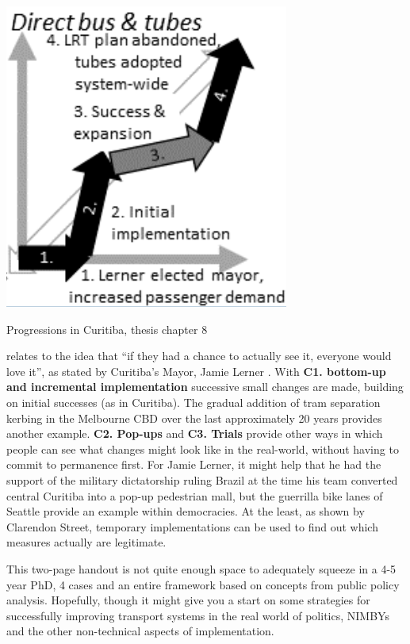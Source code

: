\documentclass[nobib]{tufte-handout}
\begin{document}
\begin{marginfigure}
        \includegraphics[width=\linewidth]{Curitiba_3}
  \caption{Progressions in Curitiba, thesis chapter 8}
  \label{fig:Curitiba}
\end{marginfigure}

 relates to the idea that “if they had a chance to actually see it, everyone would love it”, as stated by Curitiba's Mayor, Jamie Lerner \citep{McKibben:2007aa}. With \textbf{C1. bottom-up and incremental implementation} successive small changes are made, building on initial successes (as in Curitiba). The gradual addition of tram separation kerbing in the Melbourne CBD over the last  approximately 20 years provides another example. \textbf{C2. Pop-ups} and \textbf{C3. Trials} provide other ways in which people can see what changes might look like in the real-world, without having to commit to permanence first.  For Jamie Lerner, it might help that he had the support of the military dictatorship ruling Brazil at the time his team converted central Curitiba into a pop-up pedestrian mall, but the guerrilla bike lanes of Seattle\citep{Fucoloro:2013aa} provide an example within democracies. At the least, as shown by Clarendon Street\citep{Silkstone:2005aa}, temporary implementations can be used to find out which measures actually are legitimate.

This two-page handout is not quite enough space to adequately squeeze in a 4-5 year PhD, 4 cases and an entire framework based on concepts from public policy analysis. Hopefully, though it might give you a start on some strategies for successfully improving transport systems in the real world of politics, NIMBYs and the other non-technical aspects of implementation. 



\end{document}
